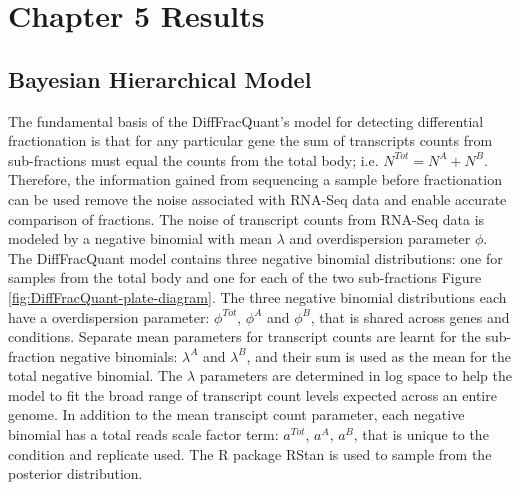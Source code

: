 \documentclass[../main.tex]{subfiles}
\begin{document}
\section{Chapter 5 Results}

\subsection{Bayesian Hierarchical Model}

The fundamental basis of the DiffFracQuant's model for detecting differential fractionation is that for any particular gene the sum of transcripts counts from sub-fractions must equal the counts from the total body; i.e. $N^{Tot} = N^{A}+N^{B}$.
Therefore, the information gained from sequencing a sample before fractionation can be used remove the noise associated with RNA-Seq data and enable accurate comparison of fractions.
The noise of transcript counts from RNA-Seq data is modeled by a negative binomial with mean $\lambda$ and overdispersion parameter $\phi$.
The DiffFracQuant model contains three negative binomial distributions: one for samples from the total body and one for each of the two sub-fractions Figure \ref{fig:DiffFracQuant-plate-diagram}.
The three negative binomial distributions each have a overdispersion parameter: $\phi^{Tot}$, $\phi^{A}$ and $\phi^{B}$, that is shared across genes and conditions.
Separate mean parameters for transcript counts are learnt for the sub-fraction negative binomials: $\lambda^A$ and $\lambda^B$, and their sum is used as the mean for the total negative binomial.
The $\lambda$ parameters are determined in log space to help the model to fit the broad range of transcript count levels expected across an entire genome.
In addition to the mean transcipt count parameter, each negative binomial has a total reads scale factor term: $a^{Tot}$, $a^{A}$, $a^{B}$, that is unique to the condition and replicate used.
The R package RStan is used to sample from the posterior distribution.
\end{document}
